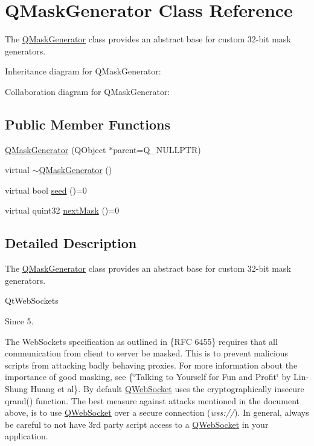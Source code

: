 \hypertarget{class_q_mask_generator}{}\section{Q\+Mask\+Generator Class Reference}
\label{class_q_mask_generator}


The \mbox{\hyperlink{class_q_mask_generator}{Q\+Mask\+Generator}} class provides an abstract base for custom 32-\/bit mask generators.  




Inheritance diagram for Q\+Mask\+Generator\+:


Collaboration diagram for Q\+Mask\+Generator\+:
\subsection*{Public Member Functions}
\begin{DoxyCompactItemize}
\item 
\mbox{\hyperlink{class_q_mask_generator_a80242dc4dc33b2b74613dd621c9d6cc3}{Q\+Mask\+Generator}} (Q\+Object $\ast$parent=Q\+\_\+\+N\+U\+L\+L\+P\+TR)
\item 
virtual \mbox{\hyperlink{class_q_mask_generator_a18c15adfaebe0673c1a78f0259035b35}{$\sim$\+Q\+Mask\+Generator}} ()
\item 
virtual bool \mbox{\hyperlink{class_q_mask_generator_a4e311595fc7cd457bd5c50293cdb7916}{seed}} ()=0
\item 
virtual quint32 \mbox{\hyperlink{class_q_mask_generator_aff3309c2b67cfd4ae6e0cba615e9d4dd}{next\+Mask}} ()=0
\end{DoxyCompactItemize}


\subsection{Detailed Description}
The \mbox{\hyperlink{class_q_mask_generator}{Q\+Mask\+Generator}} class provides an abstract base for custom 32-\/bit mask generators. 

Qt\+Web\+Sockets \begin{DoxySince}{Since}
5.
\end{DoxySince}
The Web\+Sockets specification as outlined in  \{R\+FC 6455\} requires that all communication from client to server be masked. This is to prevent malicious scripts from attacking badly behaving proxies. For more information about the importance of good masking, see  \{\char`\"{}\+Talking to Yourself for Fun and Profit\char`\"{} by Lin-\/\+Shung Huang et al\}. By default \mbox{\hyperlink{class_q_web_socket}{Q\+Web\+Socket}} uses the cryptographically insecure qrand() function. The best measure against attacks mentioned in the document above, is to use \mbox{\hyperlink{class_q_web_socket}{Q\+Web\+Socket}} over a secure connection ({\itshape wss\+://}). In general, always be careful to not have 3rd party script access to a \mbox{\hyperlink{class_q_web_socket}{Q\+Web\+Socket}} in your application. 

